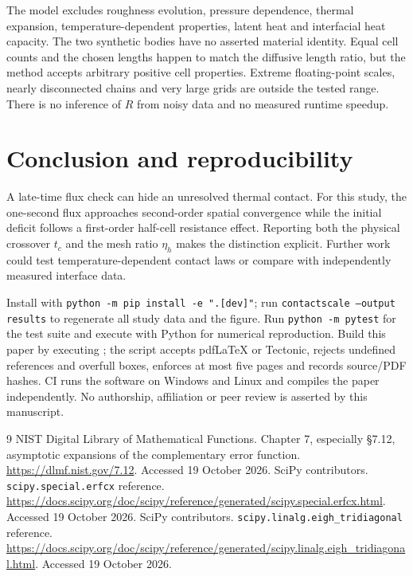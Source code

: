 \documentclass[11pt,a4paper]{article}
\begin{document}
The model excludes roughness evolution, pressure dependence, thermal expansion,
temperature-dependent properties, latent heat and interfacial heat capacity.
The two synthetic bodies have no asserted material identity. Equal cell counts
and the chosen lengths happen to match the diffusive length ratio, but the
method accepts arbitrary positive cell properties. Extreme floating-point scales,
nearly disconnected chains and very large grids are outside the tested range.
There is no inference of $R$ from noisy data and no measured runtime speedup.

\section{Conclusion and reproducibility}
A late-time flux check can hide an unresolved thermal contact. For this study,
the one-second flux approaches second-order spatial convergence while the
initial deficit follows a first-order half-cell resistance effect. Reporting
both the physical crossover $t_c$ and the mesh ratio $\eta_h$ makes the
distinction explicit. Further work could test temperature-dependent contact
laws or compare with independently measured interface data.

Install with \texttt{python -m pip install -e ".[dev]"}; run
\texttt{contactscale --output results} to regenerate all study data and the
figure. Run \texttt{python -m pytest} for the test suite and execute
 with Python for numerical reproduction.
Build this paper by executing ; the script accepts
pdfLaTeX or Tectonic, rejects undefined references and overfull boxes, enforces
at most five pages and records source/PDF hashes. CI runs the software on
Windows and Linux and compiles the paper independently. No authorship,
affiliation or peer review is asserted by this manuscript.

\begin{thebibliography}{9}
 NIST Digital Library of Mathematical Functions.
Chapter 7, especially \S7.12, asymptotic expansions of the complementary error
function. \url{https://dlmf.nist.gov/7.12}. Accessed 19 October 2026.
 SciPy contributors. \texttt{scipy.special.erfcx} reference.
\url{https://docs.scipy.org/doc/scipy/reference/generated/scipy.special.erfcx.html}.
Accessed 19 October 2026.
 SciPy contributors. \texttt{scipy.linalg.eigh\_tridiagonal} reference.
\url{https://docs.scipy.org/doc/scipy/reference/generated/scipy.linalg.eigh_tridiagonal.html}.
Accessed 19 October 2026.
\end{thebibliography}
\end{document}
